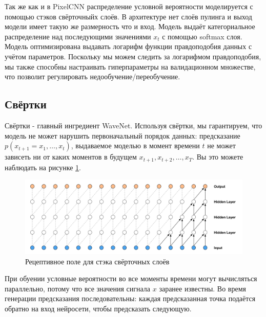 \documentclass[../diploma.tex]{subfiles}
\begin{document}


Так же как и в PixelCNN \cite{article:oord2016conditional} распределение условной вероятности моделируется с помощью стэков свёрточныйх слоёв. В архитектуре нет слоёв пулинга и выход модели имеет такую же размерность что и вход. Модель выдаёт категориальное распределение над последующими значениями $x_t$ с помощью softmax слоя. Модель оптимизирована выдавать логарифм функции правдоподобия данных с учётом параметров. Поскольку мы можем следить за логарифмом правдоподобия, мы также способны настраивать гиперпараметры на валидационном множестве, что позволит регулировать недообучение/переобучение. 

\newpage
\subsection{Свёртки}

Свёртки - главный ингредиент WaveNet. Используя свёртки, мы гарантируем, что модель не может нарушить первоначальный порядок данных: предсказание $p(x_{t+1} = x_1, \dots, x_{t})$, выдаваемое моделью в момент времени $t$ не может зависеть ни от каких моментов в будущем $x_{t+1}, x_{t+2}, \dots, x_{T}$. Вы это можете наблюдать на рисунке \ref{fig:casual}.

\label{sec:convolutions}

\begin{figure}[ht!]
    \centering
  \includegraphics[scale=0.35]{img/casual}
  \caption{Рецептивное поле для стэка свёрточных слоёв}
  \label{fig:casual}
\end{figure}

При обуении условные вероятности во все моменты времени могут вычисляться параллельно, потому что все значения сигнала $x$ заранее известны. Во время генерации предсказания последовательны: каждая предсказанная точка подаётся обратно на вход нейросети, чтобы предсказать следующую.
\end{document}
